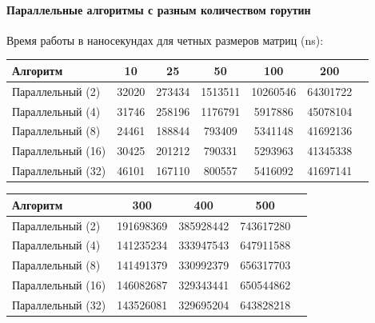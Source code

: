 \documentclass[utf8x, 12pt]{G7-32} %
\begin{document}
\newpage

\begin{flushleft}
	\paragraph{Параллельные алгоритмы с разным количеством горутин}
\end{flushleft}

Время работы в наносекундах для четных размеров матриц (ns):\\
\begin{tabular}{l*{5}{c}r}
	Алгоритм & 10 & 25 & 50 & 100 & 200 \\
	\hline
	Параллельный (2) & 32020 & 273434 & 1513511 & 10260546 & 64301722 \\
	Параллельный (4) & 31746 & 258196 & 1176791 & 5917886 & 45078104 \\
	Параллельный (8) & 24461 & 188844 & 793409 & 5341148 & 41692136 \\
	Параллельный (16) & 30425 & 201212 & 790331 & 5293963 & 41345338 \\
	Параллельный (32) & 46101 & 167110 & 800557 & 5416092 & 41697141 \\
\end{tabular}
\begin{tabular}{l*{3}{c}r}
	Алгоритм & 300 & 400 & 500 \\
	\hline
	Параллельный (2) & 191698369 & 385928442 & 743617280 \\
	Параллельный (4) & 141235234 & 333947543 & 647911588 \\
	Параллельный (8) & 141491379 & 330992379 & 656317703 \\
	Параллельный (16) & 146082687 & 329343441 & 650544862 \\
	Параллельный (32) & 143526081 & 329695204 & 643828218 \\
\end{tabular}
\\
\\
\end{document}
